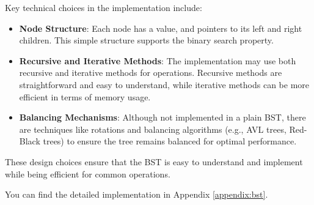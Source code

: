 Key technical choices in the implementation include:
\begin{itemize}
    \item \textbf{Node Structure}: Each node has a value, and pointers to its left and right children. This simple structure supports the binary search property.
    \item \textbf{Recursive and Iterative Methods}: The implementation may use both recursive and iterative methods for operations. Recursive methods are straightforward and easy to understand, while iterative methods can be more efficient in terms of memory usage.
    \item \textbf{Balancing Mechanisms}: Although not implemented in a plain BST, there are techniques like rotations and balancing algorithms (e.g., AVL trees, Red-Black trees) to ensure the tree remains balanced for optimal performance.
\end{itemize}

These design choices ensure that the BST is easy to understand and implement while being efficient for common operations.

You can find the detailed implementation in Appendix \ref{appendix:bst}.
